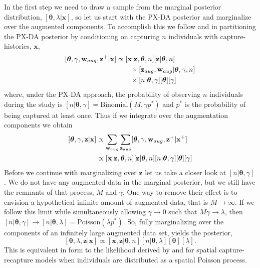 \documentclass[12pt]{article}
\newcommand{\bx}{\ensuremath{\mathbf{x}}}
\newcommand{\bz}{\ensuremath{\mathbf{z}}}
\newcommand{\bt}{\ensuremath{\boldsymbol{\theta}}}
\newcommand{\bw}{\ensuremath{\mathbf{w}}}
\begin{document}
In the first step we need to draw a sample from the marginal posterior distribution, $[\bt,\lambda|\bx]$, so let us start with the PX-DA posterior and marginalize over the augmented components. To accomplish this we follow \cite{king2015capture} and \cite{Hooten:2023aa} in partitioning the PX-DA posterior by conditioning on capturing $n$ individuals with capture-histories, $\bx$,
\[
\begin{aligned}
\relax[\bt,\gamma,\bw_{aug}, \bz^+|\bx] &\propto [\bx|\bz,\bt,n] [\bz|\bt,n]\\
&\qquad \times [\bz_{aug},\bw_{aug}|\bt,\gamma,n] \\
&\qquad \times [n|\bt,\gamma][\bt][\gamma] \\
\end{aligned}
\]
where, under the PX-DA approach, the probability of observing $n$ individuals during the study is $[n|\bt,\gamma] = \text{Binomial}(M, \gamma p^*)$ and $p^*$ is the probability of being captured at least once. Thus if we integrate over the augmentation components we obtain
\[
\begin{aligned}
\relax[\bt,\gamma, \bz|\bx] &\propto \sum_{\bw_{aug}} \sum_{\bz_{aug}} [\bt,\gamma,\bw_{aug}, \bz^+|\bx^+] \\
&\propto  [\bx|\bz,\bt,n][\bz|\bt,n][n|\bt,\gamma][\bt][\gamma]
\end{aligned}
\]
Before we continue with marginalizing over $\bz$ let us take a closer look at  $[n|\bt,\gamma]$. We do not have any augmented data in the marginal posterior, but we still have the remnants of that process, $M$ and $\gamma$. One way to remove their effect is to envision a hypothetical infinite amount of augmented data, that is $M\to \infty$. If we follow this limit while simultaneously allowing $\gamma \to 0$ such that $M\gamma \to \lambda$, then  $[n|\bt,\gamma] \to [n|\bt,\lambda] = \text{Poisson}(\lambda p^*)$.  So, fully marginalizing over the components of an infinitely large augmented data set, yields the posterior,
\[
[\bt,\lambda, \bz|\bx] \propto  [\bx,\bz|\bt,n][n|\bt, \lambda][\bt][\lambda].
\]
This is equivalent in form to the likelihood derived by \cite{glennie2019open} and \cite{zhang2023flexible} for spatial capture-recapture models when individuals are distributed as a spatial Poisson process.
\end{document}
